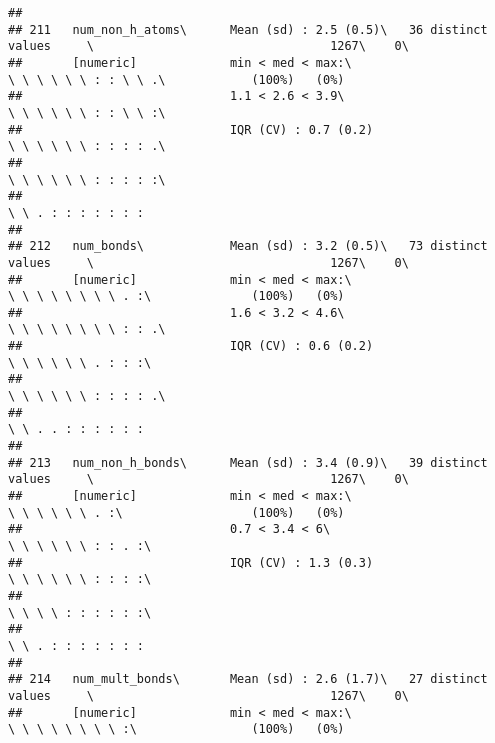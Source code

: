 \documentclass[]{article}
\begin{document}
\begin{verbatim}
## 
## 211   num_non_h_atoms\      Mean (sd) : 2.5 (0.5)\   36 distinct values     \                                 1267\    0\       
##       [numeric]             min < med < max:\                               \ \ \ \ \ \ : : \ \ .\            (100%)   (0%)     
##                             1.1 < 2.6 < 3.9\                                \ \ \ \ \ \ : : \ \ :\                              
##                             IQR (CV) : 0.7 (0.2)                            \ \ \ \ \ \ : : : : .\                              
##                                                                             \ \ \ \ \ \ : : : : :\                              
##                                                                             \ \ . : : : : : : :                                 
## 
## 212   num_bonds\            Mean (sd) : 3.2 (0.5)\   73 distinct values     \                                 1267\    0\       
##       [numeric]             min < med < max:\                               \ \ \ \ \ \ \ \ . :\              (100%)   (0%)     
##                             1.6 < 3.2 < 4.6\                                \ \ \ \ \ \ \ \ : : .\                              
##                             IQR (CV) : 0.6 (0.2)                            \ \ \ \ \ \ . : : :\                                
##                                                                             \ \ \ \ \ \ : : : : .\                              
##                                                                             \ \ . . : : : : : :                                 
## 
## 213   num_non_h_bonds\      Mean (sd) : 3.4 (0.9)\   39 distinct values     \                                 1267\    0\       
##       [numeric]             min < med < max:\                               \ \ \ \ \ \ . :\                  (100%)   (0%)     
##                             0.7 < 3.4 < 6\                                  \ \ \ \ \ \ : : . :\                                
##                             IQR (CV) : 1.3 (0.3)                            \ \ \ \ \ \ : : : :\                                
##                                                                             \ \ \ \ : : : : : :\                                
##                                                                             \ \ . : : : : : : :                                 
## 
## 214   num_mult_bonds\       Mean (sd) : 2.6 (1.7)\   27 distinct values     \                                 1267\    0\       
##       [numeric]             min < med < max:\                               \ \ \ \ \ \ \ \ :\                (100%)   (0%)     

\end{verbatim}
\end{document}
